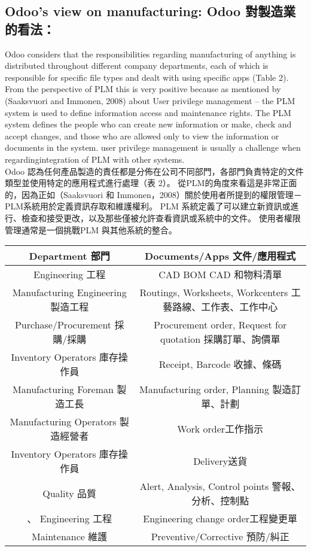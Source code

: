 \subsection{Odoo’s view on manufacturing: Odoo 對製造業的看法：}


\fontsize{12}{2.5pt}\sectionef 
 {Odoo considers that the responsibilities regarding manufacturing of anything is distributed throughout different company departments, each of which is responsible for
specific file types and dealt with using specific apps (Table 2). From the perspective of PLM this is very positive because as mentioned by (Saaksvuori and Immonen, 2008) about User privilege management – the PLM system is used to define information access and maintenance rights. The PLM system defines the people who can create new information or make, check and accept changes, and those who are allowed only to view the information or documents in the system. user privilege management is usually a challenge when regardingintegration of PLM with other systems.}\\[1pt]

\fontsize{12}{2.5pt}\sectionef  
{Odoo 認為任何產品製造的責任都是分佈在公司不同部門，各部門負責特定的文件類型並使用特定的應用程式進行處理（表 2）。 從PLM的角度來看這是非常正面的，因為正如（Saaksvuori 和 Immonen，2008）關於使用者所提到的權限管理－PLM系統用於定義資訊存取和維護權利。 PLM 系統定義了可以建立新資訊或進行、檢查和接受更改，以及那些僅被允許查看資訊或系統中的文件。 使用者權限管理通常是一個挑戰PLM 與其他系統的整合。}
\\[15pt]


\begin{table}[htbp]
    \centering
    \begin{tabular}{|c|c|}
        \hline
         Department 部門& Documents/Apps 文件/應用程式\\
        \hline
        Engineering  工程& CAD BOM CAD 和物料清單 \\
        Manufacturing Engineering  製造工程& Routings, Worksheets, Workcenters 工藝路線、工作表、工作中心\\
       Purchase/Procurement 採購/採購& Procurement order, Request for quotation 採購訂單、詢價單\\
       Inventory Operators 庫存操作員&Receipt, Barcode 收據、條碼 \\
       Manufacturing Foreman 製造工長& Manufacturing order, Planning 製造訂單、計劃 \\
       Manufacturing Operators 製造經營者& Work order工作指示 \\
       Inventory Operators 庫存操作員& Delivery送貨 \\
       Quality 品質& Alert, Analysis, Control points 警報、分析、控制點\\、
      Engineering  工程& Engineering change order工程變更單 \\
      Maintenance 維護& Preventive/Corrective 預防/糾正\\
        \hline
    \end{tabular}
\end{table}


